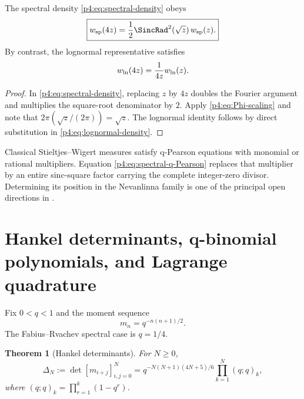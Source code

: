 \documentclass[11pt,oneside]{article}
\newtheorem{theorem}{Theorem}[section]
\theoremstyle{definition}
\theoremstyle{remark}
\begin{document}
\begin{proposition}
\label{p4:prop:q-Pearson}
The spectral density \eqref{p4:eq:spectral-density} obeys
\begin{equation}
 \boxed{
 w_{\rm sp}(4z)=\frac12\SincRad^2(\sqrt z)\,w_{\rm sp}(z).}
 \label{p4:eq:spectral-q-Pearson}
\end{equation}
By contrast, the lognormal representative satisfies
\begin{equation}
 w_{\rm ln}(4z)=\frac1{4z}w_{\rm ln}(z).
 \label{p4:eq:lognormal-q-Pearson}
\end{equation}
\end{proposition}

\begin{proof}
In \eqref{p4:eq:spectral-density}, replacing $z$ by $4z$ doubles the Fourier argument and
multiplies the square-root denominator by $2$.  Apply \eqref{p4:eq:Phi-scaling} and note that
$2\pi(\sqrt z/(2\pi))=\sqrt z$.  The lognormal identity follows by direct substitution in
\eqref{p4:eq:lognormal-density}.
\end{proof}

\begin{remark}
Classical Stieltjes--Wigert measures satisfy q-Pearson equations with monomial or rational
multipliers.  Equation \eqref{p4:eq:spectral-q-Pearson} replaces that multiplier by an entire
sinc-square factor carrying the complete integer-zero divisor.  Determining its position in
the Nevanlinna family is one of the principal open directions in .
\end{remark}

\section{Hankel determinants, q-binomial polynomials, and Lagrange quadrature}
\label{p4:sec:q-orthogonal}

Fix $0<q<1$ and the moment sequence
\begin{equation}
 m_n=q^{-n(n+1)/2}.
 \label{p4:eq:general-q-moments}
\end{equation}
The Fabius--Rvachev spectral case is $q=1/4$.

\begin{theorem}[Hankel determinants]
\label{p4:thm:Hankel-determinants}
For $N\geq0$,
\begin{equation}
 \boxed{
 \Delta_N:=\det[m_{i+j}]_{i,j=0}^{N}
 =q^{-N(N+1)(4N+5)/6}
 \prod_{k=1}^{N}(q;q)_k,}
 \label{p4:eq:Hankel-determinant}
\end{equation}
where $(q;q)_k=\prod_{r=1}^k(1-q^r)$.
\end{theorem}
\end{document}
